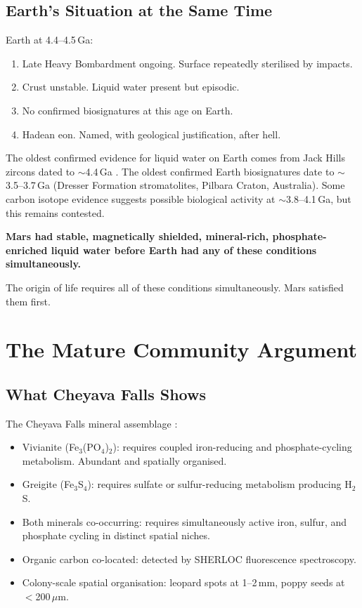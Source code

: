 \documentclass[11pt, a4paper]{article}
\begin{document}
\subsection{Earth's Situation at the Same Time}

Earth at 4.4--4.5\,Ga:

\begin{enumerate}[leftmargin=*, label=(\arabic*)]
\item Late Heavy Bombardment ongoing.
  Surface repeatedly sterilised by impacts.
\item Crust unstable.
  Liquid water present but episodic.
\item No confirmed biosignatures at
  this age on Earth.
\item Hadean eon.
  Named, with geological justification,
  after hell.
\end{enumerate}

The oldest confirmed evidence for liquid
water on Earth comes from Jack Hills zircons
dated to $\sim$4.4\,Ga \cite{wilde2001}.
The oldest confirmed Earth biosignatures date
to $\sim$3.5--3.7\,Ga (Dresser Formation
stromatolites, Pilbara Craton, Australia).
Some carbon isotope evidence suggests possible
biological activity at $\sim$3.8--4.1\,Ga,
but this remains contested.

\textbf{Mars had stable, magnetically shielded,
mineral-rich, phosphate-enriched liquid water
before Earth had any of these conditions
simultaneously.}

The origin of life requires all of these
conditions simultaneously.
Mars satisfied them first.

\section{The Mature Community Argument}

\subsection{What Cheyava Falls Shows}

The Cheyava Falls mineral assemblage
\cite{hurowitz2025}:

\begin{itemize}[leftmargin=*]
\item Vivianite (Fe$_3$(PO$_4$)$_2$):
  requires coupled iron-reducing and
  phosphate-cycling metabolism.
  Abundant and spatially organised.
\item Greigite (Fe$_3$S$_4$):
  requires sulfate or sulfur-reducing
  metabolism producing H$_2$S.
\item Both minerals co-occurring:
  requires simultaneously active
  iron, sulfur, and phosphate cycling
  in distinct spatial niches.
\item Organic carbon co-located:
  detected by SHERLOC fluorescence
  spectroscopy.
\item Colony-scale spatial organisation:
  leopard spots at 1--2\,mm, poppy seeds
  at $<$200\,$\mu$m.
\end{itemize}
\end{document}
